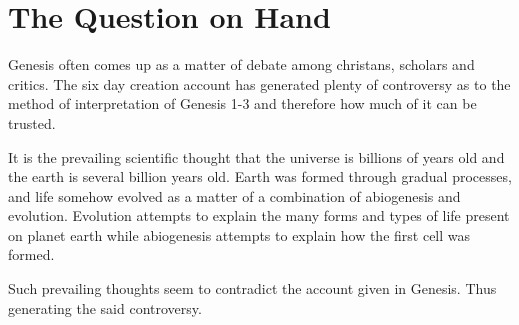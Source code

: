 \documentclass[11]{article}
\begin{document}
\part{The Question on Hand}

Genesis often comes up as a matter of debate among christans, scholars and critics. The six day creation account has generated plenty of controversy as to the method of interpretation of Genesis 1-3 and therefore how much of it can be trusted. 

It is the prevailing scientific thought that the universe is billions of years old and the earth is several billion years old. Earth was formed through gradual processes, and life somehow evolved as a matter of a combination of abiogenesis and evolution. Evolution attempts to explain the many forms and types of life present on planet earth while abiogenesis attempts to explain how the first cell was formed.


Such prevailing thoughts seem to contradict the account given in Genesis. Thus generating the said controversy.
\end{document}

